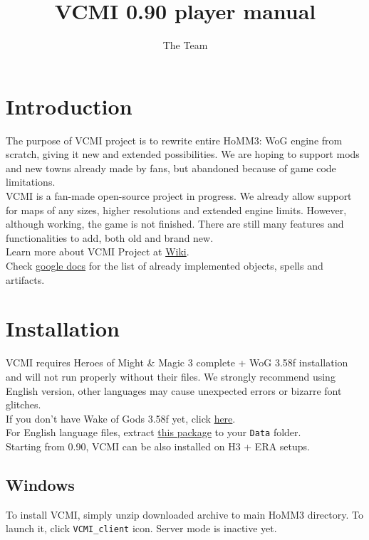 \documentclass[a4size,final]{article}
\begin{document}
\normalsize
\pagestyle{plain}
\setcounter{secnumdepth}{1}
\title{\Huge VCMI 0.90 player manual}
\author{The Team}
\maketitle
\section{Introduction}
The purpose of VCMI project is to rewrite entire HoMM3: WoG engine from scratch, giving it new and extended possibilities. We are hoping to support mods and new towns already made by fans, but abandoned because of game code limitations.\\
VCMI is a fan-made open-source project in progress. We already allow support for maps of any sizes, higher resolutions and extended engine limits. However, although working, the game is not finished. There are still many features and functionalities to add, both old and brand new.\smallskip\\
Learn more about VCMI Project at \href{http://wiki.vcmi.eu/index.php?title=VCMI}{Wiki}.\\
Check \href{http://spreadsheets.google.com/ccc?key=pRhYM0YkAF9lIpLe4raNAWA&hl=pl}{google docs} for the list of already implemented objects, spells and artifacts.
\section{Installation}
VCMI requires Heroes of Might \& Magic 3 complete + WoG 3.58f installation and will not run properly without their files. We strongly recommend using English version, other languages may cause unexpected errors or bizarre font glitches.\\
If you don't have Wake of Gods 3.58f yet, click \href{http://www.maps4heroes.com/heroes3/files/allinone_358f.zip}{here}.\\
For English language files, extract \href{http://download.vcmi.eu/dataEN.7z}{this package} to your \texttt{Data} folder.\bigskip\\
Starting from 0.90, VCMI can be also installed on H3 + ERA setups.
\subsection{Windows}
To install VCMI, simply unzip downloaded archive to main HoMM3 directory. To launch it, click \texttt{VCMI\_client} icon. Server mode is inactive yet.\medskip\\
\end{document}
